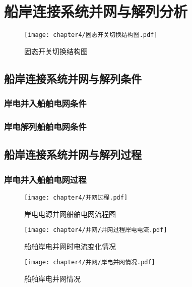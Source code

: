 \chapter{船岸连接系统并网与解列分析}

\begin{figure}[!htp]
	\centering
	\texttt{[image: chapter4/固态开关切换结构图.pdf]}
	\caption{固态开关切换结构图}
	\label{fig:固态开关切换结构图}
\end{figure}

\section{船岸连接系统并网与解列条件}

\subsection{岸电并入船舶电网条件}

\subsection{岸电解列船舶电网条件}

\section{船岸连接系统并网与解列过程}

\subsection{岸电并入船舶电网过程}


\begin{figure}[!htp]
	\centering
	\texttt{[image: chapter4/并网过程.pdf]}
	\caption{岸电电源并网船舶电网流程图}
	\label{fig:岸电电源并网船舶电网流程图}
\end{figure}


\begin{figure}[!htp]
	\centering
	\texttt{[image: chapter4/并网/并网过程岸电电流.pdf]}
	\caption{船舶岸电并网时电流变化情况}
	\label{fig:船舶岸电并网时电流变化情况}
\end{figure}

\begin{figure}[!htp]
	\centering
	\texttt{[image: chapter4/并网/岸电并网情况.pdf]}
	\caption{船舶岸电并网情况}
	\label{fig:船舶岸电并网情况}
\end{figure}

